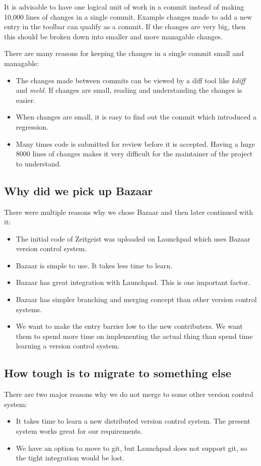 It is advisable to have one logical unit of work in a commit instead of making 10,000 
lines of changes in a single commit. Example changes made to add a new entry in the toolbar 
can qualify as a commit. If the changes are very big, then this should be broken down into 
smaller and more managable changes. 

There are many reasons for keeping the changes in a single commit small and managable: 

\begin{itemize}
\item The changes made between commits can be viewed by a diff tool like \textit{kdiff} and \textit{meld}. 
If changes are small, reading and understanding the changes is easier.
\item When changes are small, it is easy to find out the commit which introduced a regression.
\item Many times code is submitted for review before it is accepted. Having a huge 8000 lines 
of changes makes it very difficult for the maintainer of the project to understand.
\end{itemize}

\subsection{Why did we pick up Bazaar}
There were multiple reasons why we chose Bazaar and then later continued with it: 
\begin{itemize}
\item The initial code of Zeitgeist was uploaded on Launchpad which uses Bazaar version control system.
\item Bazaar is simple to use. It takes less time to learn.
\item Bazaar has great integration with Launchpad. This is one important factor.
\item Bazaar has simpler branching and merging concept than other version control systems.
\item We want to make the entry barrier low to the new contributers. We want them to spend more time 
on implementing the actual thing than spend time learning a version control system.
\end{itemize}

\subsection{How tough is to migrate to something else}
There are two major reasons why we do not merge to some other version control system: 
\begin{itemize}
\item It takes time to learn a new distributed version control system. The present system works 
great for our requirements.
\item We have an option to move to git, but Launchpad does not support git, so the tight 
integration would be lost.
\end{itemize}


